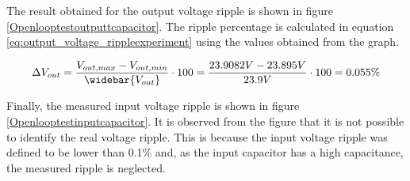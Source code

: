 The result obtained for the output voltage ripple is shown in figure \ref{Openlooptestoutputtcapacitor}. The ripple percentage is calculated in equation \ref{eq:output_voltage_rippleexperiment} using the values obtained from the graph. 

\begin{equation} \label{eq:output_voltage_rippleexperiment}
\Delta V_{out} = \frac{V_{out,max}-V_{out,min}}{\widebar{V_{out}}} \cdot 100 = \frac{23.9082V - 23.895V }{23.9V} \cdot 100 = 0.055\%
\end{equation}

Finally, the measured input voltage ripple is shown in figure \ref{Openlooptestinputcapacitor}. It is observed from the figure that it is not possible to identify the real voltage ripple. This is because the input voltage ripple was defined to be lower than 0.1\% and, as the input capacitor has a high capacitance, the measured ripple is neglected. 


